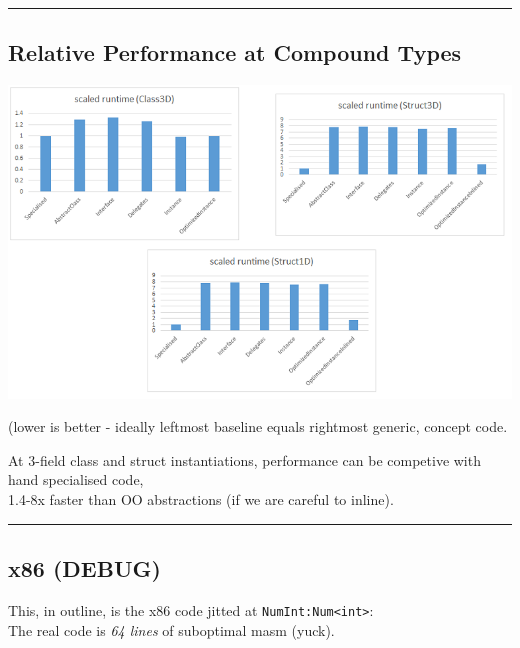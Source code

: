 \begin{center}\rule{0.5\linewidth}{\linethickness}\end{center}

\subsection{Relative Performance at Compound
Types}\label{relative-performance-at-compound-types}

\includegraphics{./images/perf2.png}

(lower is better - ideally leftmost baseline equals rightmost generic,
concept code.

At 3-field class and struct instantiations, performance can be competive
with hand specialised code,\\
1.4-8x faster than OO abstractions (if we are careful to inline).

\begin{center}\rule{0.5\linewidth}{\linethickness}\end{center}

\subsection{x86 (DEBUG)}\label{x86-debug}

This, in outline, is the x86 code jitted at
\lstinline!NumInt:Num<int>!:\\
The real code is \emph{64 lines} of suboptimal masm (yuck).


